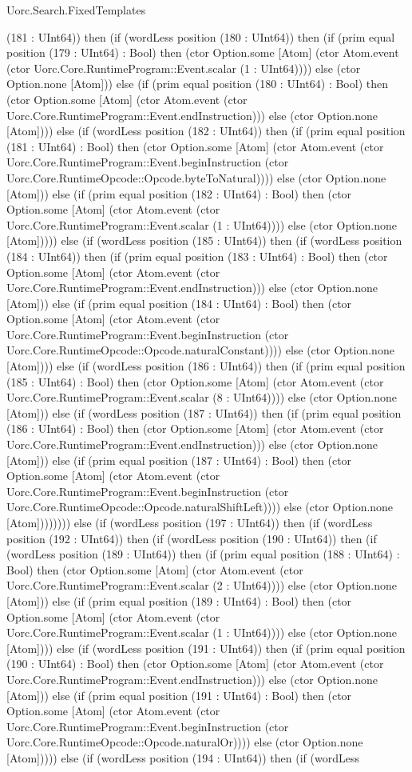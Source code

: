 \begin{lexlean}{Uorc.Search.FixedTemplates}
\begin{semanticmodule}
{(181 : UInt64)) then (if (wordLess position (180 : UInt64)) then (if (prim equal position (179 : UInt64) : Bool) then (ctor Option.some [Atom] (ctor Atom.event (ctor Uorc.Core.RuntimeProgram::Event.scalar (1 : UInt64)))) else (ctor Option.none [Atom])) else (if (prim equal position (180 : UInt64) : Bool) then (ctor Option.some [Atom] (ctor Atom.event (ctor Uorc.Core.RuntimeProgram::Event.endInstruction))) else (ctor Option.none [Atom]))) else (if (wordLess position (182 : UInt64)) then (if (prim equal position (181 : UInt64) : Bool) then (ctor Option.some [Atom] (ctor Atom.event (ctor Uorc.Core.RuntimeProgram::Event.beginInstruction (ctor Uorc.Core.RuntimeOpcode::Opcode.byteToNatural)))) else (ctor Option.none [Atom])) else (if (prim equal position (182 : UInt64) : Bool) then (ctor Option.some [Atom] (ctor Atom.event (ctor Uorc.Core.RuntimeProgram::Event.scalar (1 : UInt64)))) else (ctor Option.none [Atom])))) else (if (wordLess position (185 : UInt64)) then (if (wordLess position (184 : UInt64)) then (if (prim equal position (183 : UInt64) : Bool) then (ctor Option.some [Atom] (ctor Atom.event (ctor Uorc.Core.RuntimeProgram::Event.endInstruction))) else (ctor Option.none [Atom])) else (if (prim equal position (184 : UInt64) : Bool) then (ctor Option.some [Atom] (ctor Atom.event (ctor Uorc.Core.RuntimeProgram::Event.beginInstruction (ctor Uorc.Core.RuntimeOpcode::Opcode.naturalConstant)))) else (ctor Option.none [Atom]))) else (if (wordLess position (186 : UInt64)) then (if (prim equal position (185 : UInt64) : Bool) then (ctor Option.some [Atom] (ctor Atom.event (ctor Uorc.Core.RuntimeProgram::Event.scalar (8 : UInt64)))) else (ctor Option.none [Atom])) else (if (wordLess position (187 : UInt64)) then (if (prim equal position (186 : UInt64) : Bool) then (ctor Option.some [Atom] (ctor Atom.event (ctor Uorc.Core.RuntimeProgram::Event.endInstruction))) else (ctor Option.none [Atom])) else (if (prim equal position (187 : UInt64) : Bool) then (ctor Option.some [Atom] (ctor Atom.event (ctor Uorc.Core.RuntimeProgram::Event.beginInstruction (ctor Uorc.Core.RuntimeOpcode::Opcode.naturalShiftLeft)))) else (ctor Option.none [Atom]))))))) else (if (wordLess position (197 : UInt64)) then (if (wordLess position (192 : UInt64)) then (if (wordLess position (190 : UInt64)) then (if (wordLess position (189 : UInt64)) then (if (prim equal position (188 : UInt64) : Bool) then (ctor Option.some [Atom] (ctor Atom.event (ctor Uorc.Core.RuntimeProgram::Event.scalar (2 : UInt64)))) else (ctor Option.none [Atom])) else (if (prim equal position (189 : UInt64) : Bool) then (ctor Option.some [Atom] (ctor Atom.event (ctor Uorc.Core.RuntimeProgram::Event.scalar (1 : UInt64)))) else (ctor Option.none [Atom]))) else (if (wordLess position (191 : UInt64)) then (if (prim equal position (190 : UInt64) : Bool) then (ctor Option.some [Atom] (ctor Atom.event (ctor Uorc.Core.RuntimeProgram::Event.endInstruction))) else (ctor Option.none [Atom])) else (if (prim equal position (191 : UInt64) : Bool) then (ctor Option.some [Atom] (ctor Atom.event (ctor Uorc.Core.RuntimeProgram::Event.beginInstruction (ctor Uorc.Core.RuntimeOpcode::Opcode.naturalOr)))) else (ctor Option.none [Atom])))) else (if (wordLess position (194 : UInt64)) then (if (wordLess }
\end{semanticmodule}
\end{lexlean}
